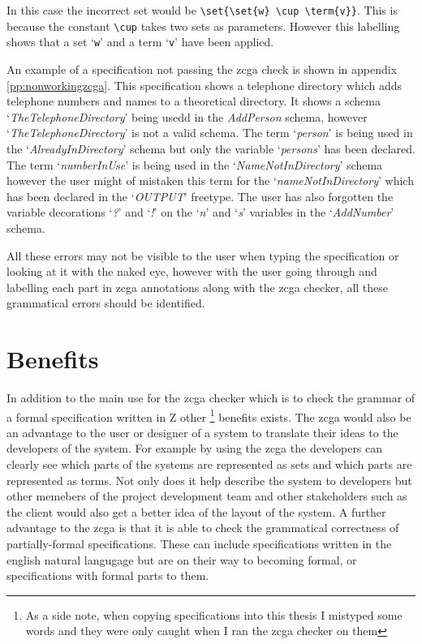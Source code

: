 In this case the incorrect set would be \verb|\set{\set{w} \cup \term{v}}|. This
is because the constant \verb|\cup| takes two sets as parameters. However this
labelling shows that a set `\verb|w|' and a term `\verb|v|' have been applied. 

An example of a specification not passing the \gls{zcga} check is shown in
appendix \ref{pp:nonworkingzcga}. This specification shows a telephone directory
which adds telephone numbers and names to a theoretical directory. It shows a
schema `\emph{TheTelephoneDirectory}' being usedd in the \emph{AddPerson}
schema, however `\emph{TheTelephoneDirectory}' is not a valid schema. The term
`\emph{person}' is being used in the `\emph{AlreadyInDirectory}' schema but only
the variable `\emph{persons}' has been declared. The term `\emph{numberInUse}'
is being used in the `\emph{NameNotInDirectory}' schema however the user might
of mistaken this term for the `\emph{nameNotInDirectory}' which has been
declared in the `\emph{OUTPUT}' freetype. The user has also forgotten the
variable decorations `\emph{?}' and `\emph{!}' on the `\emph{n}' and `\emph{s}'
variables in the `\emph{AddNumber}' schema.

All these errors may not be visible to the user when typing the specification or
looking at it with the naked eye, however with the user going through and
labelling each part in \gls{zcga} annotations along with the \gls{zcga} checker,
all these grammatical errors should be identified.


\section{Benefits}

In addition to the main use for the \gls{zcga} checker which is to check the
grammar of a formal specification written in Z other \footnote{As a side note,
when copying specifications into this thesis I mistyped some words and they were
only caught when I ran the \gls{zcga} checker on them} benefits exists. The
\gls{zcga} would also be an advantage to the user or designer of a system to
translate their ideas to the developers of the system. For example by using the
\gls{zcga} the developers can clearly see which parts of the systems are
represented as sets and which parts are represented as terms. Not only does it
help describe the system to developers but other memebers of the project
development team and other stakeholders such as the client would also get a
better idea of the layout of the system. A further advantage to the \gls{zcga}
is that it is able to check the grammatical correctness of partially-formal
specifications. These can include specifications written in the english natural
langugage but are on their way to becoming formal, or specifications with formal
parts to them.

